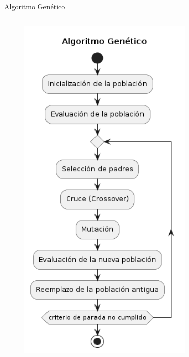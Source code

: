\documentclass{beamer}
\begin{document}
\begin{frame}{Algoritmo Genético}
\begin{columns}
\begin{column}{0.4\textwidth}
\begin{figure}
                \includegraphics[width=0.75\textwidth]{pic/algoritmo-genetico.png}
                \label{fig:algoritmo-genetico}
            \end{figure}
        \end{column}
    \end{columns}
\end{frame}
\end{document}
